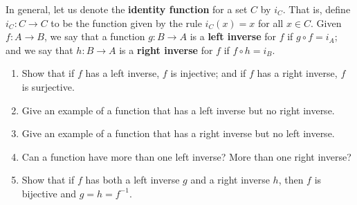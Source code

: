 \documentclass[12pt]{article}
\newenvironment{problem}[2][Exercise]{\begin{trivlist}
\item[\hskip \labelsep {\bfseries #1}\hskip \labelsep {\bfseries #2.}]}{\end{trivlist}}
\begin{document}
\begin{problem}{1.2.5}
In general, let us denote the \textbf{identity function} for a set $C$ by $i_C$. That is, define $i_C: C \rightarrow C$ to be the function given by the rule $i_C\left(x\right) = x$ for all $x \in C$. Given $f:A\rightarrow B$, we say that a function $g: B\rightarrow A$ is a \textbf{left inverse} for $f$ if $g\circ f = i_A$; and we say that $h:B\rightarrow A$ is a \textbf{right inverse} for $f$ if $f\circ h=i_B$.
\begin{enumerate}[label=(\alph*)]
	\item Show that if $f$ has a left inverse, $f$ is injective; and if $f$ has a right inverse, $f$ is surjective.
	\item Give an example of a function that has a left inverse but no right inverse.
	\item Give an example of a function that has a right inverse but no left inverse.
	\item Can a function have more than one left inverse? More than one right inverse?
	\item Show that if $f$ has both a left inverse $g$ and a right inverse $h$, then $f$ is bijective and $g=h=f^{-1}$.
\end{enumerate}
\end{problem}
\end{document}
